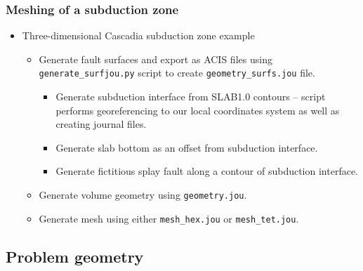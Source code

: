 \documentclass{beamer}
\newcommand{\important}[1]{{\color{red}#1}}
\begin{document}
\begin{frame}
  \frametitle{Meshing of a subduction zone}
  
  \begin{itemize}
  \item Three-dimensional Cascadia subduction zone example\\
    \important{{\tt examples/3d/subduction/mesh}}
    \begin{itemize}
    \item Generate fault surfaces and export as ACIS files using
      \important{\tt generate\_surfjou.py} script to create
      \important{\tt geometry\_surfs.jou} file.
      \begin{itemize}
      \item Generate subduction interface from SLAB1.0 contours --
        script performs georeferencing to our local coordinates system
        as well as creating journal files.
      \item Generate slab bottom as an offset from subduction interface.
      \item Generate fictitious splay fault along a contour of subduction
        interface.
      \end{itemize}
    \item Generate volume geometry using \important{\tt geometry.jou}.
    \item Generate mesh using either \important{\tt mesh\_hex.jou} or
      \important{\tt mesh\_tet.jou}.
    \end{itemize}
  \end{itemize}


\end{frame}


\subsection{Problem geometry}
\end{document}
